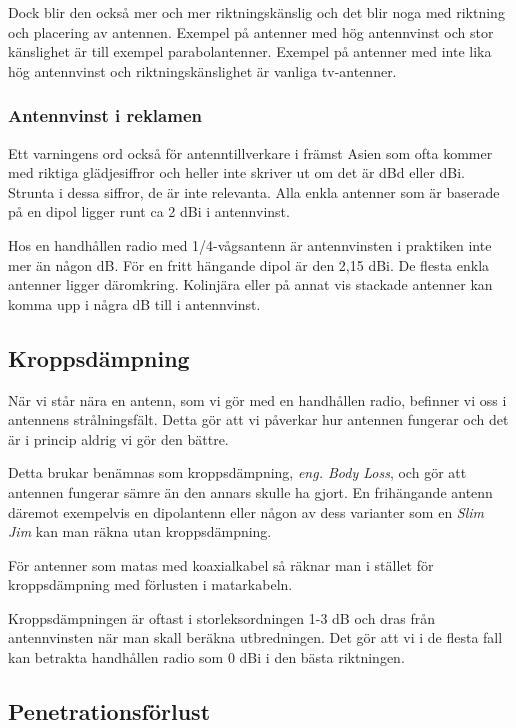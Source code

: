 \documentclass[12ypt,swedish,a4paper]{report}
\begin{document}
Dock blir den också mer och mer riktningskänslig och det blir noga med riktning och placering av antennen. Exempel på antenner med hög antennvinst och stor känslighet är till exempel parabolantenner. Exempel på antenner med inte lika hög antennvinst och riktningskänslighet är vanliga tv-antenner.

\subsubsection{Antennvinst i reklamen}

Ett varningens ord också för antenntillverkare i främst Asien som ofta kommer med riktiga glädjesiffror och heller inte skriver ut om det är dBd eller dBi. Strunta i dessa siffror, de är inte relevanta. Alla enkla antenner som är baserade på en dipol ligger runt ca 2 dBi i antennvinst. 

Hos en handhållen radio med 1/4-vågsantenn är antennvinsten i praktiken inte mer än någon dB. För en fritt hängande dipol är den 2,15 dBi. De flesta enkla antenner ligger däromkring. Kolinjära eller på annat vis stackade antenner kan komma upp i några dB till i antennvinst.

\subsection{Kroppsdämpning}

När vi står nära en antenn, som vi gör med en handhållen radio, befinner vi oss i antennens strålningsfält. Detta gör att vi påverkar hur antennen fungerar och det är i princip aldrig vi gör den bättre. 

Detta brukar benämnas som kroppsdämpning, \textit{eng. Body Loss}, och gör att antennen fungerar sämre än den annars skulle ha gjort. En frihängande antenn däremot exempelvis en dipolantenn eller någon av dess varianter som en \textit{Slim Jim} kan man räkna utan kroppsdämpning.

För antenner som matas med koaxialkabel så räknar man i stället för kroppsdämpning med förlusten i matarkabeln. 

Kroppsdämpningen är oftast i storleksordningen 1-3 dB och dras från antennvinsten när man skall beräkna utbredningen. Det gör att vi i de flesta fall kan betrakta handhållen radio som 0 dBi i den bästa riktningen.

\subsection{Penetrationsförlust}
\end{document}
